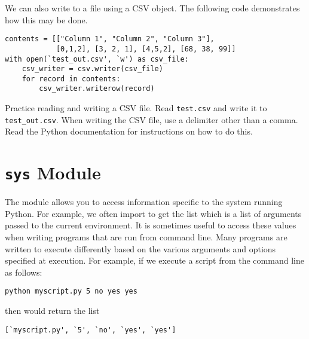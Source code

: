 We can also write to a  file using a CSV  object.  The following code demonstrates how this may be done.

\begin{lstlisting}
contents = [["Column 1", "Column 2", "Column 3"],
            [0,1,2], [3, 2, 1], [4,5,2], [68, 38, 99]]
with open(`test_out.csv', `w') as csv_file:
    csv_writer = csv.writer(csv_file)
    for record in contents:
        csv_writer.writerow(record)
\end{lstlisting}

\begin{problem}
Practice reading and writing a CSV file.
Read \texttt{test.csv} and write it to \texttt{test\_out.csv}.
When writing the CSV file, use a delimiter other than a comma.
Read the Python documentation for instructions on how to do this.
\end{problem}

\section*{\texttt{sys} Module}
The  module allows you to access information specific to the system running Python.
For example, we often import  to get the list  which is a list of arguments passed to the current environment.
It is sometimes useful to access these values when writing programs that are run from command line.
Many programs are written to execute differently based on the various arguments and options specified at execution.
For example, if we execute a script from the command line as follows:
\begin{verbatim}
python myscript.py 5 no yes yes
\end{verbatim}
then  would return the list
\begin{verbatim}
[`myscript.py', `5', `no', `yes', `yes']
\end{verbatim}

